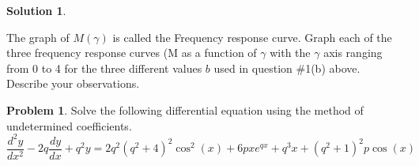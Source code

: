 \documentclass[10pt]{article}
\theoremstyle{definition}
\newtheorem{problem}{Problem}
\newtheorem{soln}{Solution}
\begin{document}
\begin{soln}
\begin{enumerate}[label=(\alph*)]
\begin{enumerate}[label=\roman*.]
\begin{equation}
                  \end{equation}
                  The graph of $M\left(\gamma\right)$ is called the Frequency response curve. Graph each of the three frequency response curves
                  (M as a function of $\gamma$ with the $\gamma$ axis ranging from 0 to 4 for the three different values $b$ used in question \#1(b) above. Describe your observations.
          \end{enumerate}
  \end{enumerate}
\end{soln}
\newpage

\begin{problem}
Solve the following differential equation using the method of undetermined coefficients.
$$\frac{d^2y}{dx^2}-2q\frac{dy}{dx}+q^2y=2q^2\left(q^2+4\right)^2\cos^2\left(x\right)+6pxe^{qx}+q^3x+(q^2+1)^2p\cos\left(x\right)$$
\end{problem}
\end{document}
